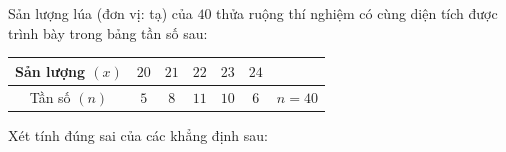 \begin{ex}
Sản lượng lúa (đơn vị: tạ) của $40$ thửa ruộng thí nghiệm có cùng diện tích được trình bày trong bảng tần số sau:
\begin{center}
\begin{tabular}{|c|c|c|c|c|c|c|}\hline
Sản lượng $(x)$ & $20$ & $21$ & $22$ & $23$ & $24$ & \\\hline
Tần số $(n)$ & $5$ & $8$ & $11$ & $10$ & $6$ & $n=40$\\\hline
\end{tabular}
\end{center}
Xét tính đúng sai của các khẳng định sau:
\end{ex}
